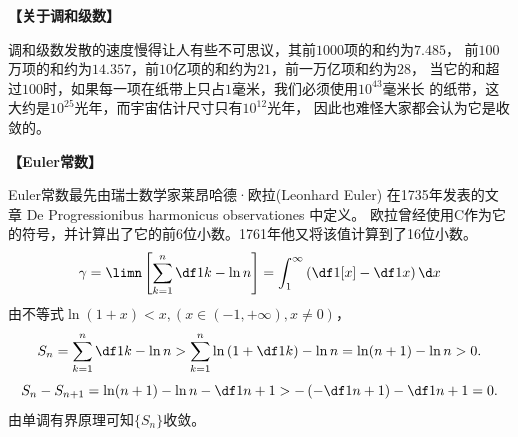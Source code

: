 \begin{shaded}

% 		

% 	

{\bf 【关于调和级数】}

调和级数发散的速度慢得让人有些不可思议，其前$1000$项的和约为$7.485$，
前$100$万项的和约为$14.357$，前$10$亿项的和约为$21$，前一万亿项和约为$28$，
当它的和超过$100$时，如果每一项在纸带上只占$1$毫米，我们必须使用$10^{43}$毫米长
的纸带，这大约是$10^{25}$光年，而宇宙估计尺寸只有$10^{12}$光年，
因此也难怪大家都会认为它是收敛的。


{\bf 【Euler常数】}

Euler常数最先由瑞士数学家莱昂哈德·欧拉(Leonhard Euler)
在1735年发表的文章 De Progressionibus harmonicus observationes 中定义。
欧拉曾经使用C作为它的符号，并计算出了它的前6位小数。1761年他又将该值计算到了16位小数。
$$\gamma=\limn\left[\sum\limits_{k=1}^n\df1k-\ln n\right]
=\int_1^{\infty}\left(\df1{[x]}-\df1x\right)\d x$$
由不等式$\ln(1+x)<x,(x\in(-1,+\infty),x\ne 0)$，
$$S_n=\sum\limits_{k=1}^n\df1k-\ln n>\sum\limits_{k=1}^n
\ln\left(1+\df1k\right)-\ln n=\ln(n+1)-\ln n>0.$$
$$S_n-S_{n+1}=\ln(n+1)-\ln n-\df1{n+1}>-\left(-\df1{n+1}\right)
-\df1{n+1}=0.$$
由单调有界原理可知$\{S_n\}$收敛。
\end{shaded}

